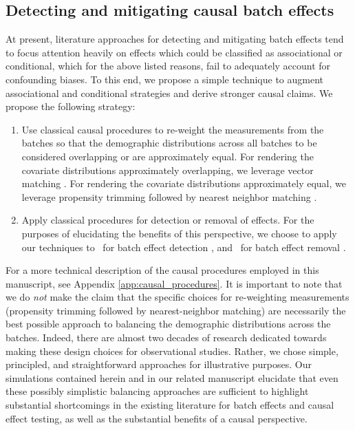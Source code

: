 \subsection{Detecting and mitigating causal batch effects}
\label{sec:cccombat}
At present, literature approaches for detecting and mitigating batch effects tend to focus attention heavily on effects which could be classified as associational or conditional, which for the above listed reasons, fail to adequately account for confounding biases. To this end, we propose a simple technique to augment associational and conditional strategies and derive stronger causal claims. We propose the following strategy:
\begin{enumerate}[leftmargin=*]
    \item Use classical causal procedures to re-weight the measurements from the batches so that the demographic distributions across all batches to be considered overlapping or are approximately equal. For rendering the covariate distributions approximately overlapping, we leverage vector matching \cite{Lopez2014}. For rendering the covariate distributions approximately equal, we leverage propensity trimming followed by nearest neighbor matching \cite{Stuart2010Feb,Powell2020Sep}. 
    \item Apply classical procedures for detection or removal of {} effects. For the purposes of elucidating the benefits of this perspective, we choose to apply our techniques to \cDcorr~for batch effect detection \cite{Wang2015,Bridgeford2023Jul}, and \ccombat~for batch effect removal \cite{Pearl2010Jul,Johnson2007Jan,Leek2010-ua,Leek2015-jc,Wachinger2020Feb,Yu2018Nov,Pomponio2020Mar}.
\end{enumerate}

For a more technical description of the causal procedures employed in this manuscript, see Appendix \ref{app:causal_procedures}. It is important to note that we do \textit{not} make the claim that the specific choices for re-weighting measurements (propensity trimming followed by nearest-neighbor matching) are necessarily the best possible approach to balancing the demographic distributions across the batches. Indeed, there are almost two decades of research dedicated towards making these design choices for observational studies. Rather, we chose simple, principled, and straightforward approaches for illustrative purposes. Our simulations contained herein and in our related manuscript \cite{Bridgeford2023Jul} elucidate that even these possibly simplistic balancing approaches are sufficient to highlight substantial shortcomings in the existing literature for batch effects and causal effect testing, as well as the substantial benefits of a causal perspective.

